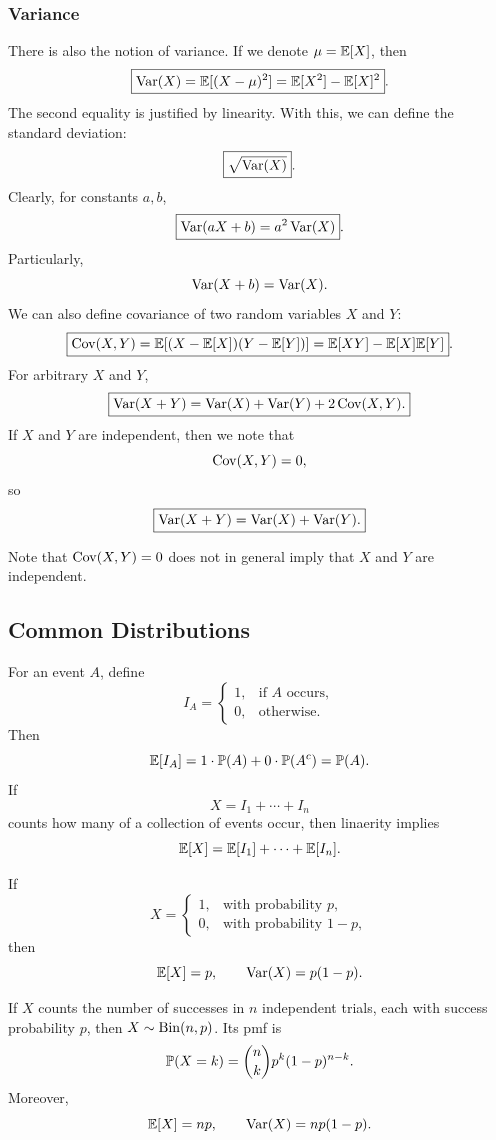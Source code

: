 \subsubsection{Variance}

There is also the notion of variance. If we denote $\mu=\mathbb{E}[X]$, then
\[
\boxed{\operatorname{Var}(X)=\mathbb{E}[(X-\mu)^2] =\mathbb{E}[X^2]-\mathbb{E}[X]^2}.
\]
The second equality is justified by linearity. With this, we can define the 
standard deviation:
\[
\boxed{\sqrt{\operatorname{Var}(X)}}.
\]
Clearly, for constants $a,b$,
\[
\boxed{\operatorname{Var}(aX+b)=a^2\operatorname{Var}(X)}.
\]
Particularly,
\[
\operatorname{Var}(X+b)=\operatorname{Var}(X).
\]
We can also define covariance of two random variables $X$ and $Y$:
\[
\boxed{\operatorname{Cov}(X,Y) = \mathbb{E}[(X-\mathbb{E}[X])(Y-\mathbb{E}[Y])] = \mathbb{E}[XY]-\mathbb{E}[X]\mathbb{E}[Y]}.
\]
For arbitrary $X$ and $Y$,
\[
\boxed{
\operatorname{Var}(X+Y)
=
\operatorname{Var}(X)+\operatorname{Var}(Y)+2\operatorname{Cov}(X,Y).
}
\]
If $X$ and $Y$ are independent, then we note that
\[
\operatorname{Cov}(X,Y)=0,
\]
so
\[
\boxed{
\operatorname{Var}(X+Y)
=
\operatorname{Var}(X)+\operatorname{Var}(Y).
}
\]
\begin{remark}
Note that $\operatorname{Cov}(X,Y) = 0$ does not in general imply that $X$ and $Y$ are independent.
\end{remark}


\subsection{Common Distributions}

\begin{example}
For an event $A$, define
\[
I_A=
\begin{cases}
1, & \text{if $A$ occurs},\\
0, & \text{otherwise}.
\end{cases}
\]
Then
\[
\mathbb{E}[I_A]= 1 \cdot \mathbb{P}(A) + 0 \cdot \mathbb{P}(A^c) = \mathbb{P}(A).
\]
If
\[
X=I_1+\cdots+I_n
\]
counts how many of a collection of events occur, then linaerity implies
\[
\mathbb{E}[X]
=
\mathbb{E}[I_1]+\cdots+\mathbb{E}[I_n].
\]
\end{example}

\begin{example}
If
\[
X=
\begin{cases}
1, & \text{with probability $p$},\\
0, & \text{with probability $1-p$},
\end{cases}
\]
then
\[
\mathbb{E}[X]=p, \qquad\operatorname{Var}(X)=p(1-p).
\]
\end{example}

\begin{example}  
If $X$ counts the number of successes in $n$ independent trials, each with
success probability $p$, then $X\sim\operatorname{Bin}(n,p)$.  
Its pmf is
\[
\mathbb{P}(X=k) =\binom{n}{k}p^k(1-p)^{n-k}.
\]   
Moreover,
\[
\mathbb{E}[X]=np, \qquad \operatorname{Var}(X)=np(1-p).
\]  
\end{example}

